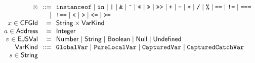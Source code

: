 \[\begin{array}{r@{~~}r@{~~}l@{}ll}
 \inop & ::= &
\multicolumn{2}{@{} l}{
 \TT{instanceof} \mid \TT{in} \mid \TT{|} \mid \TT{\&}
               \mid \TT{\^} \mid \TT{<<} \mid \TT{>>} \mid \TT{>>>}
\mid \TT{+} \mid \TT{-} \mid \TT{*} \mid \TT{/} \mid \TT{\%} \mid \TT{==} \mid \TT{!=}
\mid \TT{===}} \\
&\mid& \TT{!==} \mid \TT{<} \mid \TT{>} \mid \TT{<=} \mid \TT{>=}
\\

x \in \CFGId & = & \String \times \SF{VarKind} &
\\

a \in \SF{Address} & = & \SF{Integer} &
\\

v \in \SF{EJSVal} & = &
\multicolumn{2}{@{} l}{
 \SF{Number} \mid \String \mid \SF{Boolean} \mid \SF{Null} \mid \SF{Undefined}
}\\

\SF{VarKind} & ::= &
\multicolumn{2}{@{} l}{
\TT{GlobalVar} \mid \TT{PureLocalVar} \mid \TT{CapturedVar} \mid \TT{CapturedCatchVar}}
\\

s \in \String &&&\\

\end{array}
\]
\newpage

